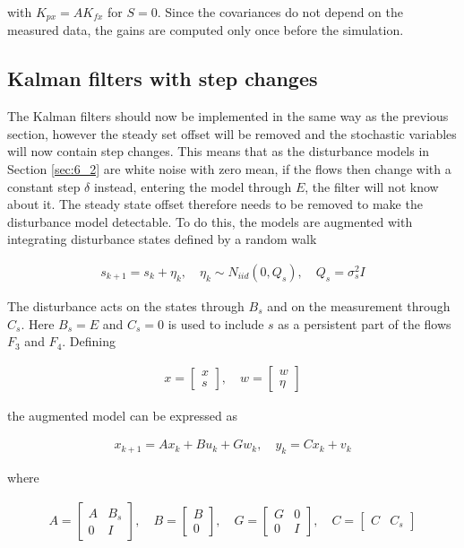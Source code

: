 with $K_{px}=AK_{fx}$ for $S=0$. Since the covariances do not depend on the measured data, the gains are computed only once before the simulation. 

\subsection{Kalman filters with step changes}

The Kalman filters should now be implemented in the same way as the previous section, however the steady set offset will be removed and the stochastic variables will now contain step changes. This means that as the disturbance models in Section \ref{sec:6_2} are white noise with zero mean, if the flows then change with a constant step $\delta$ instead, entering the model through $E$, the filter will not know about it. The steady state offset therefore needs to be removed to make the disturbance model detectable. To do this, the models are augmented with integrating disturbance states defined by a random walk

\begin{align}
    s_{k+1} = s_k + \eta_k, \quad \eta_k \sim N_{iid}(0,Q_s), \quad Q_s = \sigma^2_sI
\end{align}

The disturbance acts on the states through $B_s$ and on the measurement through $C_s$. Here $B_s = E$ and $C_s = 0$ is used to include $s$ as a persistent part of the flows $F_3$ and $F_4$. Defining

\begin{align}
    x = \begin{bmatrix}
        x \\
        s
    \end{bmatrix}, \quad w = \begin{bmatrix}
        w \\
        \eta
    \end{bmatrix}
\end{align}

the augmented model can be expressed as

\begin{align}
    x_{k+1} = Ax_k + Bu_k + Gw_k, \quad y_k = Cx_k + v_k
\end{align}

where

\begin{align}
    A = \begin{bmatrix}
        A & B_s \\
        0 & I
    \end{bmatrix}, \quad B = \begin{bmatrix}
        B \\ 0
    \end{bmatrix}, \quad G = \begin{bmatrix}
        G & 0 \\
        0 & I
    \end{bmatrix}, \quad C = \begin{bmatrix}
        C & C_s
    \end{bmatrix}
\end{align}

